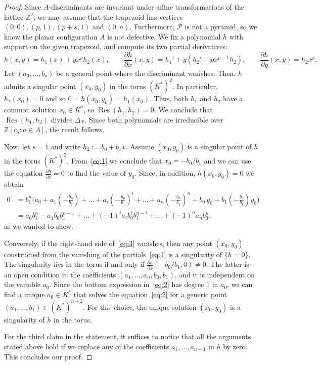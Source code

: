 \documentclass[11pt]{amsart}
\numberwithin{equation}{section}
\theoremstyle{plain}
\theoremstyle{definition}
\theoremstyle{remark}
\begin{document}
\begin{proof} 
  Since $A$-discriminants are invariant under affine transformations
  of the lattice ${\mathbb{Z}}^2$, we may assume that the trapezoid has
  vertices $(0,0), (p,1), (p+s,1)$ and $(0,n)$. Furthermore, ${\mathcal{P}}$ is
  not a pyramid, so we know the planar configuration $A$ is not
  defective.  We fix a polynomial $h$ with support on the given
  trapezoid, and compute its two partial derivatives:
\begin{equation}
  h(x,y) = h_1(x) + y x^p
  h_2(x),\qquad \frac{\partial{h}}{\partial x}(x,y)= h_1'+y(h_2'+ px^{p-1} h_2), \qquad
  \frac{\partial{h}}{\partial y}(x,y)=h_2 x^p.\label{eq:1}
\end{equation}
Let $(a_0,\ldots, b_s)$ be a general point where the discriminant
vanishes. Then, $h$ admits a singular point $(x_0,y_0)$ in the torus
$(K^*)^2$. In particular, $h_2(x_0)=0$ and so
$0=h(x_0,y_0)=h_1(x_0)$. Thus, both $h_1$ and $h_2$ have a common
solution $x_0\in K^*$, so $\operatorname{Res}(h_1,h_2)=0$. We conclude
that $\operatorname{Res}(h_1,h_2)$ divides $\Delta_{\mathcal{P}}$.  Since both
polynomials are irreducible over ${\mathbb{Z}}[c_a: a\in A]$, the result
follows.

Now, let $s=1$ and write $h_2:=b_0+b_1x$.  Assume $(x_0,y_0)$ is a
singular point of $h$ in the torus $(K^*)^2$. From~\eqref{eq:1} we
conclude that $x_0=-b_0/b_1$ and we can use the equation
$\frac{\partial{h}}{\partial x}=0$ to find the value of $y_0$. Since,
in addition, $h(x_0,y_0)=0$ we obtain
\begin{equation}
\begin{aligned}
  0&=b_1^n\big(a_0+a_1(-\frac{b_0}{b_1})+\ldots +
  a_i(-\frac{b_0}{b_1})^i+\ldots+ a_n(-\frac{b_0}{b_1})^n
  +b_0\,y_0+b_1(-\frac{b_0}{b_1})y_0\big)\\ &= a_0b_1^n
  -a_1b_0b_1^{n-1}+\ldots + (-1)^{i}a_ib_0^ib_1^{n-i}+\ldots + (-1)^n a_nb_0^n,
\end{aligned}\label{eq:2}
\end{equation}
as we wanted to show.

Conversely, if the right-hand side of~\eqref{eq:3} vanishes, then any
point $(x_0,y_0)$ constructed from the vanishing of the
partials~\eqref{eq:1} is a singularity of $\{h=0\}$. The singularity
lies in the torus if and only if $\frac{\partial{h}}{\partial
  x}(-b_0/b_1,0)\neq 0$. The latter is an open condition in the
coefficients $(a_1,\ldots, a_n,b_0,b_1)$, and it is independent on the
variable $a_0$. Since the bottom expression in~\eqref{eq:2} has degree
1 in $a_0$, we can find a unique $a_0\in K^*$ that solves the
equation~\eqref{eq:2} for a generic point $(a_1,\ldots, b_1)\in
(K^*)^{n+2}$. For this choice, the unique solution $(x_0,y_0)$ is a
singularity of $h$ in the torus.

For the third claim in the statement, it suffices to notice that all
the arguments stated above hold if we replace any of the coefficients
$a_1,\ldots, a_{n-1}$ in $h$ by zero. This concludes our proof.
\end{proof}
\end{document}
